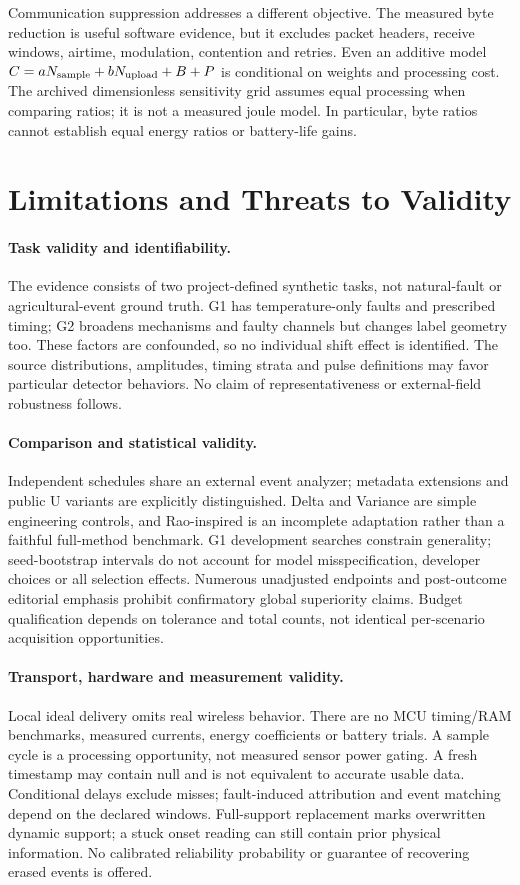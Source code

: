 \documentclass[10pt]{article}
\begin{document}
Communication suppression addresses a different objective. The measured byte reduction is useful software evidence, but it excludes packet headers, receive windows, airtime, modulation, contention and retries. Even an additive model $C=aN_{\rm sample}+bN_{\rm upload}+B+P$ is conditional on weights and processing cost. The archived dimensionless sensitivity grid assumes equal processing when comparing ratios; it is not a measured joule model. In particular, byte ratios cannot establish equal energy ratios or battery-life gains.

\section{Limitations and Threats to Validity}
\paragraph{Task validity and identifiability.}
The evidence consists of two project-defined synthetic tasks, not natural-fault or agricultural-event ground truth. G1 has temperature-only faults and prescribed timing; G2 broadens mechanisms and faulty channels but changes label geometry too. These factors are confounded, so no individual shift effect is identified. The source distributions, amplitudes, timing strata and pulse definitions may favor particular detector behaviors. No claim of representativeness or external-field robustness follows.

\paragraph{Comparison and statistical validity.}
Independent schedules share an external event analyzer; metadata extensions and public U variants are explicitly distinguished. Delta and Variance are simple engineering controls, and Rao-inspired is an incomplete adaptation rather than a faithful full-method benchmark. G1 development searches constrain generality; seed-bootstrap intervals do not account for model misspecification, developer choices or all selection effects. Numerous unadjusted endpoints and post-outcome editorial emphasis prohibit confirmatory global superiority claims. Budget qualification depends on tolerance and total counts, not identical per-scenario acquisition opportunities.

\paragraph{Transport, hardware and measurement validity.}
Local ideal delivery omits real wireless behavior. There are no MCU timing/RAM benchmarks, measured currents, energy coefficients or battery trials. A sample cycle is a processing opportunity, not measured sensor power gating. A fresh timestamp may contain null and is not equivalent to accurate usable data. Conditional delays exclude misses; fault-induced attribution and event matching depend on the declared windows. Full-support replacement marks overwritten dynamic support; a stuck onset reading can still contain prior physical information. No calibrated reliability probability or guarantee of recovering erased events is offered.
\end{document}
